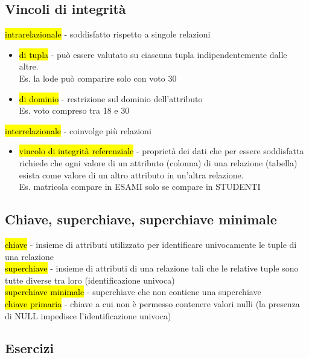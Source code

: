 \documentclass[a4paper]{article}
\begin{document}
\subsection{Vincoli di integrità}
\hl{intrarelazionale} - soddisfatto rispetto a singole relazioni
\begin{itemize}
  \item[] \hl{di tupla} -  può essere valutato su ciascuna tupla indipendentemente dalle altre.\\
  Es. la lode può comparire solo con voto 30
  \item[] \hl{di dominio} - restrizione sul dominio dell’attributo\\
  Es. voto compreso tra 18 e 30
\end{itemize}
\hl{interrelazionale} - coinvolge più relazioni
\begin{itemize}
  \item[] \hl{vincolo di integrità referenziale} - proprietà dei dati che per essere soddisfatta richiede che ogni valore di un attributo (colonna) di una relazione (tabella) esista come valore di un altro attributo in un'altra relazione.\\
  Es. matricola compare in ESAMI solo se compare in STUDENTI
\end{itemize}

\subsection{Chiave, superchiave, superchiave minimale}
\hl{chiave} - insieme di attributi utilizzato per identificare univocamente le tuple di una relazione\medskip\\
\hl{superchiave} - insieme di attributi di una relazione tali che le relative tuple sono tutte diverse tra loro (identificazione univoca)\medskip\\
\hl{superchiave minimale} - superchiave che non contiene una superchiave\medskip\\
\hl{chiave primaria} - chiave a cui non è permesso contenere valori nulli (la presenza di NULL impedisce l’identificazione univoca)

\subsection{Esercizi}
\end{document}
